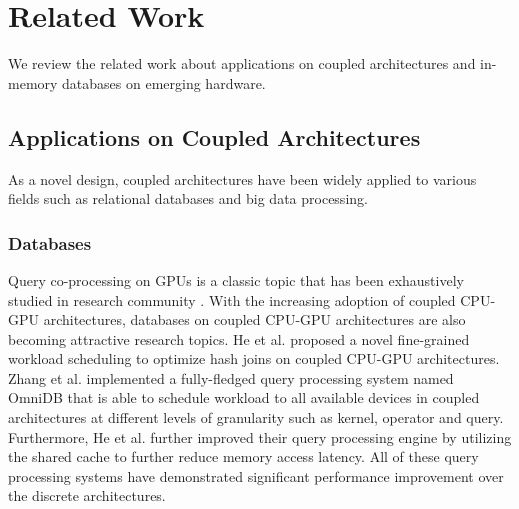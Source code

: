 \section{Related Work} \label{sec:related}
We review the related work about applications on coupled architectures and in-memory databases on emerging hardware.

\subsection{Applications on Coupled Architectures}
As a novel design, coupled architectures have been widely applied to various fields such as relational databases and big data processing.

\subsubsection{Databases}
Query co-processing on GPUs is a classic topic that has been exhaustively studied in research community \cite{Fang2010, He2009, He2008, Kaldewey2012, Kim2009, pirk2011}. With the increasing adoption of coupled CPU-GPU architectures, databases on coupled CPU-GPU architectures \cite{He2013, Zhang2013, He2014} are also becoming attractive research topics. He et al. \cite{He2013} proposed a novel fine-grained workload scheduling to optimize hash joins on coupled CPU-GPU architectures. Zhang et al. \cite{Zhang2013} implemented a fully-fledged query processing system named OmniDB that is able to schedule workload to all available devices in coupled architectures at different levels of granularity such as kernel, operator and query. Furthermore, He et al. \cite{He2014} further improved their query processing engine by utilizing the shared cache to further reduce memory access latency. All of these query processing systems have demonstrated significant performance improvement over the discrete architectures.

